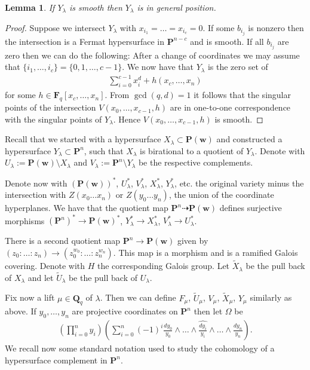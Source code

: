 \documentclass[pdftex]{sigma}
\numberwithin{equation}{section}
\newtheorem{Lemma}[Theorem]{Lemma}
\begin{document}
\begin{Lemma}\label{lemGenPos} If $Y_\lambda$ is smooth then $Y_{\lambda}$ is in general position.
\end{Lemma}

\begin{proof} Suppose we intersect $Y_{\lambda}$ with $x_{i_1}=\dots=x_{i_c}=0$. If some $b_{i_j}$ is nonzero then the inter\-section is a Fermat hypersurface in $\mathbf{P}^{n-c}$ and is smooth. If all $b_{i_j}$ are zero then we can do the following: After a change of coordinates we may assume that $\{i_1,\dots,i_{c}\}=\{0,1,\dots,c-1\}$. We now have that $Y_{\lambda}$ is the zero set of
\begin{gather*} \sum_{i=0}^{c-1} x_i^d+h(x_c,\dots,x_n)\end{gather*}
for some $h\in \mathbf{F}_q[x_c,\dots,x_n]$. From $\gcd(q,d)=1$ it follows that the singular points of the intersection $V(x_0,\dots,x_{c-1},h)$ are in one-to-one correspondence with the singular points of $Y_\lambda$. Hence $V(x_0,\dots,x_{c-1},h)$ is smooth.
\end{proof}

Recall that we started with a hypersurface $X_\lambda \subset \mathbf{P}(\mathbf{w})$ and constructed a hypersurface $Y_{\lambda}\subset \mathbf{P}^n$, such that $X_\lambda$ is birational to a quotient of $Y_\lambda$. Denote with $U_{\lambda}:=\mathbf{P}(\mathbf{w})\setminus X_\lambda$ and $V_{\lambda}:=\mathbf{P}^n\setminus Y_\lambda$ be the respective complements.

Denote now with $(\mathbf{P}(\mathbf{w}))^*$, $U_{\lambda}^*$, $V_{\lambda}^*$, $X_{\lambda}^*$, $Y_\lambda^*$, etc. the original variety minus the intersection with $Z(x_0\dots x_n)$ or $Z(y_0 \dots y_n)$, the union of the coordinate hyperplanes. We have that the quotient map $\mathbf{P}^n \dashrightarrow \mathbf{P}(\mathbf{w})$ def\/ines surjective morphisms $(\mathbf{P}^n)^*\to \mathbf{P}(\mathbf{w})^*$, $Y_\lambda^*\to X_{\lambda}^*$, $V_\lambda^*\to U_\lambda^*$.

There is a second quotient map $\mathbf{P}^n \to \mathbf{P}(\mathbf{w})$ given by $(z_0:\dots:z_n) \to (z_0^{w_0}:\dots:z_n^{w_n})$. This map is a morphism and is a ramif\/ied Galois covering. Denote with $H$ the corresponding Galois group. Let $\tilde{X}_{\lambda}$ be the pull back of $X_\lambda$ and let $\tilde{U}_{\lambda}$ be the pull back of $U_{\lambda}$.

Fix now a lift $\mu\in \mathbf{Q}_q$ of $\lambda$. Then we can def\/ine $F_{\mu}$, $\tilde{U}_{\mu}$, $V_{\mu}$, $\tilde{ X}_{\mu}$, $Y_{\mu}$ similarly as above. If $y_0,\dots,y_n$ are projective coordinates on $\mathbf{P}^n$ then let $\Omega$ be
\begin{gather*} \left(\prod_{i=0}^n y_i\right) \left(\sum_{i=0}^n (-1)^{i} \frac{dy_0}{y_0} \wedge \dots \wedge \widehat{\frac{dy_i}{y_i} }\wedge\dots \wedge\frac{dy_n}{y_n} \right).\end{gather*}
We recall now some standard notation used to study the cohomology of a hypersurface complement in $\mathbf{P}^n$.
\end{document}
